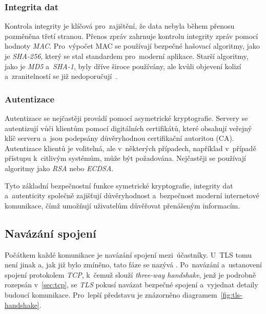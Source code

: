 \subsubsection{Integrita dat}
Kontrola integrity je klíčová pro~zajištění, že data nebyla během přenosu pozměněna třetí stranou. Přenos zpráv zahrnuje kontrolu integrity zpráv pomocí hodnoty \textit{MAC}. Pro~výpočet MAC se používají bezpečné hašovací algoritmy, jako je \textit{SHA-256}, který se stal standardem pro~moderní aplikace. Starší algoritmy, jako je \textit{MD5} a~\textit{SHA-1}, byly dříve široce používány, ale kvůli objevení kolizí a~zranitelností se již nedoporučují~\cite{sha-collision}.

\subsubsection{Autentizace}
Autentizace se nejčastěji provádí pomocí asymetrické kryptografie. Servery se autentizují vůči klientům pomocí digitálních certifikátů, které obsahují veřejný klíč serveru a~jsou podepsány důvěryhodnou certifikační autoritou (CA). Autentizace klientů je volitelná, ale v~některých případech, například v~případě přístupu k~citlivým systémům, může být požadována. Nejčastěji se používají algoritmy jako \textit{RSA} nebo \textit{ECDSA}.

Tyto základní bezpečnostní funkce symetrické kryptografie, integrity dat a~autenticity společně zajišťují důvěryhodnost a~bezpečnost moderní internetové komunikace, čímž umožňují uživatelům důvěřovat přenášeným informacím.

\subsection{Navázání spojení}

Počátkem každé komunikace je navázání spojení mezi~účastníky. U~TLS tomu není jinak a, jak již bylo zmíněno, tato fáze se nazývá . Po~navázání a~ustanovení spojení protokolem \textit{TCP}, k~čemuž slouží \textit{three-way handshake}, jenž je podrobně rozepsán v~\ref{sec:tcp}, se \textit{TLS} pokusí navázat bezpečné spojení a~vyjednat detaily budoucí komunikace. Pro~lepší představu je znázorněno diagramem~\ref{fig:tls-handshake}.

